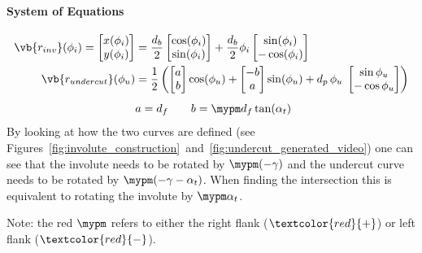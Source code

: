 \paragraph{System of Equations}
\begin{subequations}
\begin{align}
    \vb{r_{inv}}(\phi_i) =
        \begin{bmatrix}
            x(\phi_i) \\
            y(\phi_i)
        \end{bmatrix}
    &= \frac{d_b}{2}
        \begin{bmatrix}
            \cos(\phi_i) \\
            \sin(\phi_i)
        \end{bmatrix}
        + \frac{d_b}{2}\phi_i
        \begin{bmatrix}
            \sin(\phi_i) \\
            -\cos(\phi_i)
        \end{bmatrix} \\
    \vb{r_{undercut}}(\phi_u) &= \frac{1}{2} \left(
        \begin{bmatrix} a \\ b \end{bmatrix} \cos(\phi_u)
        + \begin{bmatrix} -b \\ a \end{bmatrix}\sin(\phi_u)
        + d_p\,\phi_u\; \begin{bmatrix} \sin\phi_u \\ -\cos\phi_u \end{bmatrix}
    \right)\\[1ex]
    & a = d_f \quad\quad b = \mypm d_f\tan(\alpha_t) \nonumber
\end{align}
\end{subequations}
By looking at how the two curves are defined (see Figures~\ref{fig:involute_construction}~and~\ref{fig:undercut_generated_video}) one can see that the involute needs to be rotated by $\mypm(-\gamma)$ and the undercut curve needs to be rotated by $\mypm(-\gamma - \alpha_t)$. When finding the intersection this is equivalent to rotating the involute by $\mypm \alpha_t$.

Note: the red $\mypm$ refers to either the right flank ($\textcolor{red}{+}$) or left flank ($\textcolor{red}{-}$).

